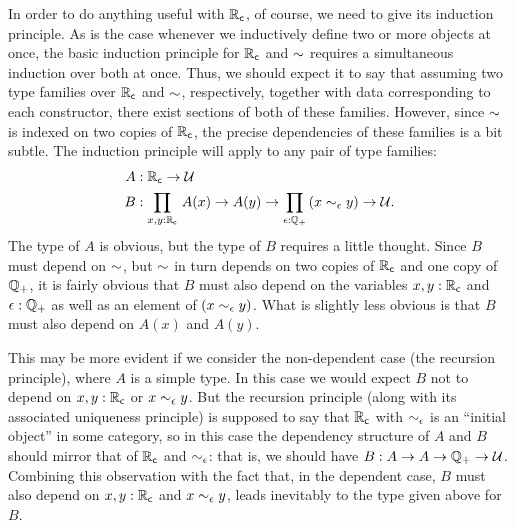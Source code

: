 In order to do anything useful with $\mathbb{R}_\mathsf{c}$, of course, we need to give its induction principle.
As is the case whenever we inductively define two or more objects at once, the basic induction principle for $\mathbb{R}_\mathsf{c}$ and $\mathord\sim$ requires a simultaneous induction over both at once.
Thus, we should expect it to say that assuming two type families over $\mathbb{R}_\mathsf{c}$ and $\mathord\sim$, respectively, together with data corresponding to each constructor, there exist sections of both of these families.
However, since $\mathord\sim$ is indexed on two copies of $\mathbb{R}_\mathsf{c}$, the precise dependencies of these families is a bit subtle.
The induction principle will apply to any pair of type families:
\begin{align*}
A&:\RC\to\type\\
B&:\prd{x,y:\RC} A(x) \to A(y) \to \prd{\epsilon:\Qp} (x\close\epsilon y) \to \type.
\end{align*}
The type of $A$ is obvious, but the type of $B$ requires a little thought.
Since $B$ must depend on $\mathord\sim$, but $\mathord\sim$ in turn depends on two copies of $\mathbb{R}_\mathsf{c}$ and one copy of $\mathbb{Q}_{+}$, it is fairly obvious that $B$ must also depend on the variables $x,y:\mathbb{R}_\mathsf{c}$ and $\epsilon:\mathbb{Q}_{+}$ as well as an element of $(x\sim_{\epsilon} y)$.
What is slightly less obvious is that $B$ must also depend on $A(x)$ and $A(y)$.

This may be more evident if we consider the non-dependent case (the recursion principle), where $A$ is a simple type.
In this case we would expect $B$ not to depend on $x,y:\mathbb{R}_\mathsf{c}$ or $x\sim_{\epsilon} y$.
But the recursion principle (along with its associated uniqueness principle) is supposed to say that $\mathbb{R}_\mathsf{c}$ with $\sim_{\epsilon}$ is an ``initial object'' in some category, so in this case the dependency structure of $A$ and $B$ should mirror that of $\mathbb{R}_\mathsf{c}$ and $\sim_{\epsilon}$: that is, we should have $B:A\to A\to \mathbb{Q}_{+} \to \mathcal{U}$.
Combining this observation with the fact that, in the dependent case, $B$ must also depend on $x,y:\mathbb{R}_\mathsf{c}$ and $x\sim_{\epsilon} y$, leads inevitably to the type given above for $B$.

